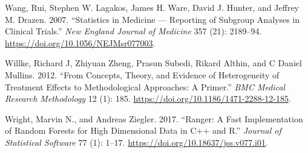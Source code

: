 \documentclass{article}
\newlength{\cslhangindent}
\newenvironment{CSLReferences}[2] %
 {\begin{list}{}{%
  \setlength{\itemindent}{0pt}
  \setlength{\leftmargin}{0pt}
  \setlength{\parsep}{0pt}
  \ifodd #1
   \setlength{\leftmargin}{\cslhangindent}
   \setlength{\itemindent}{-1\cslhangindent}
  \fi
  \setlength{\itemsep}{#2\baselineskip}}}
 {\end{list}}
\begin{document}
\begin{CSLReferences}{1}{0}
Wang, Rui, Stephen W. Lagakos, James H. Ware, David J. Hunter, and
Jeffrey M. Drazen. 2007. {``Statistics in {Medicine} --- {Reporting} of
{Subgroup} {Analyses} in {Clinical} {Trials}.''} \emph{New England
Journal of Medicine} 357 (21): 2189--94.
\url{https://doi.org/10.1056/NEJMsr077003}.

Willke, Richard J, Zhiyuan Zheng, Prasun Subedi, Rikard Althin, and C
Daniel Mullins. 2012. {``From Concepts, Theory, and Evidence of
Heterogeneity of Treatment Effects to Methodological Approaches: A
Primer.''} \emph{BMC Medical Research Methodology} 12 (1): 185.
\url{https://doi.org/10.1186/1471-2288-12-185}.

Wright, Marvin N., and Andreas Ziegler. 2017. {``Ranger: A Fast
Implementation of Random Forests for High Dimensional Data in {C}++ and
{R}.''} \emph{Journal of Statistical Software} 77 (1): 1--17.
\url{https://doi.org/10.18637/jss.v077.i01}.

\end{CSLReferences}



\end{document}
